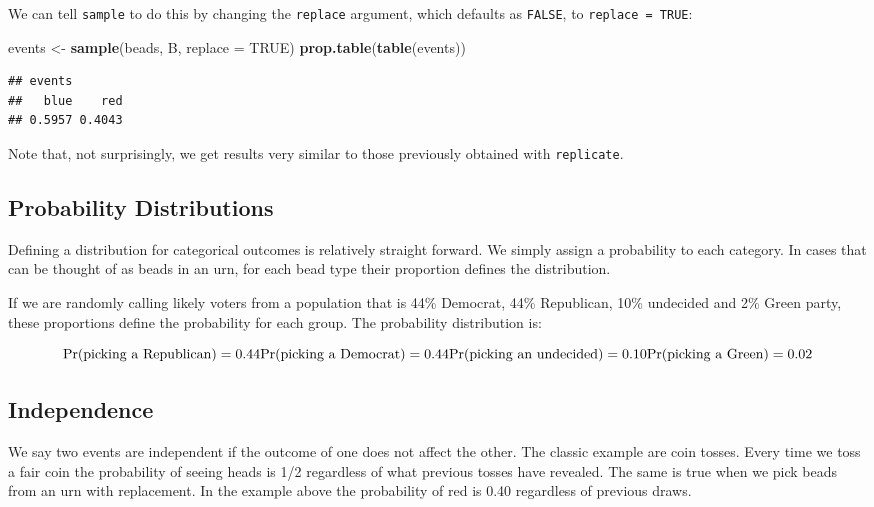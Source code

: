\documentclass[
  openany]{book}
\newenvironment{Shaded}{\begin{snugshade}}{\end{snugshade}}
\newcommand{\DataTypeTok}[1]{\textcolor[rgb]{0.13,0.29,0.53}{#1}}
\newcommand{\KeywordTok}[1]{\textcolor[rgb]{0.13,0.29,0.53}{\textbf{#1}}}
\newcommand{\NormalTok}[1]{#1}
\newcommand{\OtherTok}[1]{\textcolor[rgb]{0.56,0.35,0.01}{#1}}
\newcommand{\StringTok}[1]{\textcolor[rgb]{0.31,0.60,0.02}{#1}}
\begin{document}
We can tell \texttt{sample} to do this by changing the \texttt{replace} argument, which defaults as \texttt{FALSE}, to \texttt{replace\ =\ TRUE}:

\begin{Shaded}
\begin{Highlighting}[]
\NormalTok{events <-}\StringTok{ }\KeywordTok{sample}\NormalTok{(beads, B, }\DataTypeTok{replace =} \OtherTok{TRUE}\NormalTok{)}
\KeywordTok{prop.table}\NormalTok{(}\KeywordTok{table}\NormalTok{(events))}
\end{Highlighting}
\end{Shaded}

\begin{verbatim}
## events
##   blue    red 
## 0.5957 0.4043
\end{verbatim}

Note that, not surprisingly, we get results very similar to
those previously obtained with \texttt{replicate}.

\hypertarget{probability-distributions}{%
\subsection{Probability Distributions}\label{probability-distributions}}

Defining a distribution for categorical outcomes is relatively straight forward. We simply assign a probability to each category.
In cases that can be thought of as beads in an urn, for each bead type their proportion defines the distribution.

If we are randomly calling likely voters from a population that is 44\% Democrat, 44\% Republican, 10\% undecided and 2\% Green party, these proportions define the probability for each group. The probability distribution is:

\[
\mbox{Pr}(\mbox{picking a Republican})=0.44\\ \mbox{Pr}(\mbox{picking a Democrat})=0.44\\
\mbox{Pr}(\mbox{picking an undecided})=0.10\\
\mbox{Pr}(\mbox{picking a Green})=0.02\\
\]

\hypertarget{independence}{%
\subsection{Independence}\label{independence}}

We say two events are independent if the outcome of one does not affect the other. The classic example are coin tosses. Every time we toss a fair coin the probability of seeing heads is 1/2 regardless of what previous tosses have revealed. The same is true when we pick beads from an urn with replacement. In the example above the probability of red is 0.40 regardless of previous draws.
\end{document}
